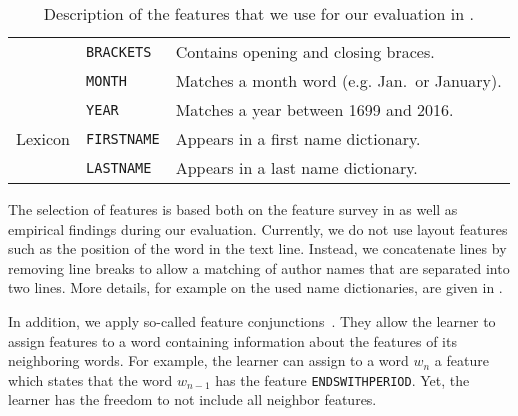 \begin{table}[t]
\begin{tabular}{l l l}
          & \texttt{BRACKETS}        & Contains opening and closing braces.\\
          & \texttt{MONTH}           & Matches a month word (e.g. Jan.\ or January).\\
          & \texttt{YEAR}            & Matches a year between 1699 and 2016.\\
  \midrule
  Lexicon & \texttt{FIRSTNAME}     & Appears in a first name dictionary.\\
  & \texttt{LASTNAME}      & Appears in a last name dictionary.\\
  \bottomrule
\end{tabular}
\caption{Description of the features that we use for our evaluation in .}
\label{tab:our-features}
\end{table}
The selection of features is based both on the feature survey in  as well as empirical findings during our evaluation.
Currently, we do not use layout features such as the position of the word in the text line.
Instead, we concatenate lines by removing line breaks to allow a matching of author names that are separated into two lines.
More details, for example on the used name dictionaries, are given in .

In addition, we apply so-called \glspl{feature conjunction}~\citep{mccallum2002mallet}.
They allow the learner to assign features to a word containing information about the features of its neighboring words.
For example, the learner can assign to a word $w_n$ a feature which states that the word $w_{n-1}$ has the feature \texttt{ENDSWITHPERIOD}.
Yet, the learner has the freedom to not include all neighbor features.

